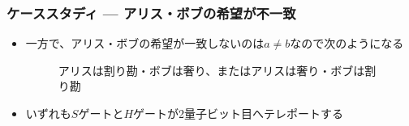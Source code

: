 \begin{frame}
  \frametitle{ケーススタディ --- アリス・ボブの希望が不一致}

  \pause
  \begin{itemize}
    \item 一方で、アリス・ボブの希望が一致しないのは$a \ne b$なので次のようになる
    \begin{figure}
      \caption{アリスは割り勘・ボブは奢り、またはアリスは奢り・ボブは割り勘}
      \label{fig:a_eq_1_b_eq_0}
    \end{figure}
  
    \item<+-> いずれも$S$ゲートと$H$ゲートが2量子ビット目へテレポートする
  \end{itemize}

  \pause
\end{frame}

